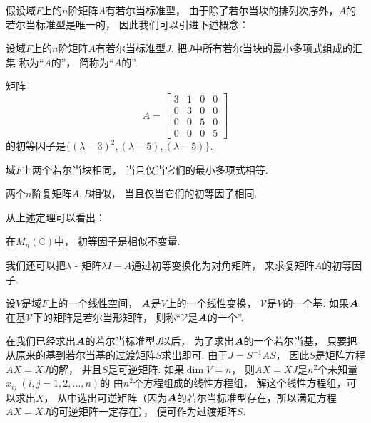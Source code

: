 假设域\(F\)上的\(n\)阶矩阵\(A\)有若尔当标准型，
由于除了若尔当块的排列次序外，\(A\)的若尔当标准型是唯一的，
因此我们可以引进下述概念：
\begin{definition}
设域\(F\)上的\(n\)阶矩阵\(A\)有若尔当标准型\(J\).
把\(J\)中所有若尔当块的最小多项式组成的汇集
称为“\(A\)的”，
简称为“\(A\)的”.
\end{definition}

\begin{example}
矩阵\begin{equation*}
	A = \begin{bmatrix}
		3 & 1 & 0 & 0 \\
		0 & 3 & 0 & 0 \\
		0 & 0 & 5 & 0 \\
		0 & 0 & 0 & 5
	\end{bmatrix}
\end{equation*}
的初等因子是\(\{(\lambda-3)^2,(\lambda-5),(\lambda-5)\}\).
\end{example}

\begin{proposition}
域\(F\)上两个若尔当块相同，
当且仅当它们的最小多项式相等.
\end{proposition}

\begin{theorem}
两个\(n\)阶复矩阵\(A,B\)相似，
当且仅当它们的初等因子相同.
\end{theorem}
从上述定理可以看出：
\begin{proposition}
在\(M_n(\mathbb{C})\)中，
初等因子是相似不变量.
\end{proposition}

我们还可以把{\(\lambda\) - 矩阵}\(\lambda I-A\)通过初等变换化为对角矩阵，
来求复矩阵\(A\)的初等因子.

\begin{definition}
设\(V\)是域\(F\)上的一个线性空间，
\(\boldsymbol{A}\)是\(V\)上的一个线性变换，
\(\mathcal{V}\)是\(V\)的一个基.
如果\(\boldsymbol{A}\)在基\(\mathcal{V}\)下的矩阵是若尔当形矩阵，
则称“\(\mathcal{V}\)是\(\boldsymbol{A}\)的一个”.
\end{definition}

在我们已经求出\(\boldsymbol{A}\)的若尔当标准型\(J\)以后，
为了求出\(\boldsymbol{A}\)的一个若尔当基，
只要把从原来的基到若尔当基的过渡矩阵\(S\)求出即可.
由于\(J = S^{-1} A S\)，
因此\(S\)是矩阵方程\(AX=XJ\)的解，
并且\(S\)是可逆矩阵.
如果\(\dim V = n\)，
则\(AX=XJ\)是\(n^2\)个未知量\(x_{ij}\ (i,j=1,2,\dotsc,n)\)的
由\(n^2\)个方程组成的线性方程组，
解这个线性方程组，可以求出\(X\)，
从中选出可逆矩阵（因为\(\boldsymbol{A}\)的若尔当标准型存在，所以满足方程\(AX=XJ\)的可逆矩阵一定存在），
便可作为过渡矩阵\(S\).
